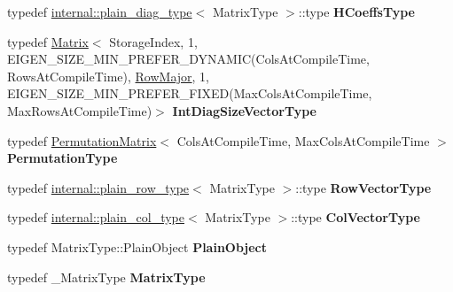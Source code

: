 \begin{DoxyCompactItemize}
\item 
\mbox{\label{group___q_r___module_ace3d0a40673c063c78035548c4259806}} 
typedef \hyperlink{struct_eigen_1_1internal_1_1plain__diag__type}{internal\+::plain\+\_\+diag\+\_\+type}$<$ Matrix\+Type $>$\+::type {\bfseries H\+Coeffs\+Type}
\item 
\mbox{\label{group___q_r___module_a79d964192e828e7cc2910f219df4b2dc}} 
typedef \hyperlink{group___core___module_class_eigen_1_1_matrix}{Matrix}$<$ Storage\+Index, 1, E\+I\+G\+E\+N\+\_\+\+S\+I\+Z\+E\+\_\+\+M\+I\+N\+\_\+\+P\+R\+E\+F\+E\+R\+\_\+\+D\+Y\+N\+A\+M\+IC(Cols\+At\+Compile\+Time, Rows\+At\+Compile\+Time), \hyperlink{group__enums_ggaacded1a18ae58b0f554751f6cdf9eb13acfcde9cd8677c5f7caf6bd603666aae3}{Row\+Major}, 1, E\+I\+G\+E\+N\+\_\+\+S\+I\+Z\+E\+\_\+\+M\+I\+N\+\_\+\+P\+R\+E\+F\+E\+R\+\_\+\+F\+I\+X\+ED(Max\+Cols\+At\+Compile\+Time, Max\+Rows\+At\+Compile\+Time)$>$ {\bfseries Int\+Diag\+Size\+Vector\+Type}
\item 
\mbox{\label{group___q_r___module_a29ba3c0d3d7ceb8558c6cba4b5afba89}} 
typedef \hyperlink{group___core___module_class_eigen_1_1_permutation_matrix}{Permutation\+Matrix}$<$ Cols\+At\+Compile\+Time, Max\+Cols\+At\+Compile\+Time $>$ {\bfseries Permutation\+Type}
\item 
\mbox{\label{group___q_r___module_a2c68675b694ac5feefbe78c6913eaa13}} 
typedef \hyperlink{struct_eigen_1_1internal_1_1plain__row__type}{internal\+::plain\+\_\+row\+\_\+type}$<$ Matrix\+Type $>$\+::type {\bfseries Row\+Vector\+Type}
\item 
\mbox{\label{group___q_r___module_a5abef403dc2f41f954dff3a52f597da4}} 
typedef \hyperlink{struct_eigen_1_1internal_1_1plain__col__type}{internal\+::plain\+\_\+col\+\_\+type}$<$ Matrix\+Type $>$\+::type {\bfseries Col\+Vector\+Type}
\item 
\mbox{\label{group___q_r___module_ac665e21d7152407fe05cd60371e5ef17}} 
typedef Matrix\+Type\+::\+Plain\+Object {\bfseries Plain\+Object}
\item 
\mbox{\label{group___q_r___module_aad34d3573bf47e18888d1bb4801e7473}} 
typedef \+\_\+\+Matrix\+Type {\bfseries Matrix\+Type}

\end{DoxyCompactItemize}
